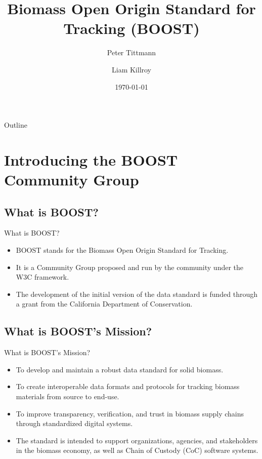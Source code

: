 \documentclass[presentation]{beamer}
\author{Peter Tittmann \and Liam Killroy}
\date{\today}
\title{Biomass Open Origin Standard for Tracking (BOOST)}
\begin{document}
\maketitle
{
\maketitle
}

\begin{frame}{Outline}
\tableofcontents
\end{frame}

\section{Introducing the BOOST Community Group}
\label{sec:introducing}

\subsection{What is BOOST?}
\label{sec:what-is-boost}

\begin{frame}{What is BOOST?}
\begin{itemize}
\item BOOST stands for the Biomass Open Origin Standard for Tracking.
\item It is a Community Group proposed and run by the community under the W3C framework.
\item The development of the initial version of the data standard is funded through a grant from the California Department of Conservation.
\end{itemize}
\end{frame}

\subsection{What is BOOST's Mission?}
\label{sec:boost-mission}

\begin{frame}{What is BOOST's Mission?}
\begin{itemize}
\item To develop and maintain a robust data standard for solid biomass.
\item To create interoperable data formats and protocols for tracking biomass materials from source to end-use.
\item To improve transparency, verification, and trust in biomass supply chains through standardized digital systems.
\item The standard is intended to support organizations, agencies, and stakeholders in the biomass economy, as well as Chain of Custody (CoC) software systems.
\end{itemize}
\end{frame}
\end{document}
